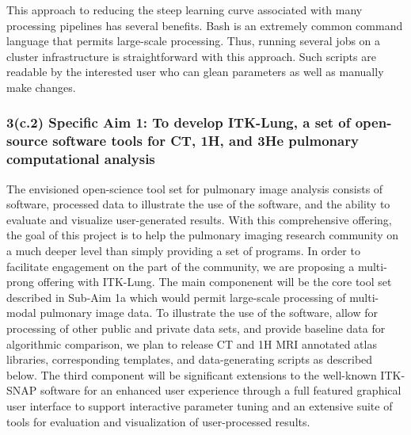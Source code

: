 \documentclass[11pt,]{article}
\newenvironment{Shaded}{\begin{snugshade}}{\end{snugshade}}
\newcommand{\KeywordTok}[1]{\textcolor[rgb]{0.13,0.29,0.53}{\textbf{{#1}}}}
\newcommand{\CommentTok}[1]{\textcolor[rgb]{0.56,0.35,0.01}{\textit{{#1}}}}
\newcommand{\NormalTok}[1]{{#1}}
\begin{document}
\begin{Shaded}
\end{Shaded}

This approach to reducing the steep learning curve associated with many
processing pipelines has several benefits. Bash is an extremely common
command language that permits large-scale processing. Thus, running
several jobs on a cluster infrastructure is straightforward with this
approach. Such scripts are readable by the interested user who can glean
parameters as well as manually make changes.

\subsubsection{3(c.2) \textbf{Specific Aim 1:} To develop ITK-Lung, a
set of open-source software tools for CT, 1H, and 3He pulmonary
computational
analysis}\label{c.2-specific-aim-1-to-develop-itk-lung-a-set-of-open-source-software-tools-for-ct-1h-and-3he-pulmonary-computational-analysis}

The envisioned open-science tool set for pulmonary image analysis
consists of software, processed data to illustrate the use of the
software, and the ability to evaluate and visualize user-generated
results. With this comprehensive offering, the goal of this project is
to help the pulmonary imaging research community on a much deeper level
than simply providing a set of programs. In order to facilitate
engagement on the part of the community, we are proposing a multi-prong
offering with ITK-Lung. The main componenent will be the core tool set
described in Sub-Aim 1a which would permit large-scale processing of
multi-modal pulmonary image data. To illustrate the use of the software,
allow for processing of other public and private data sets, and provide
baseline data for algorithmic comparison, we plan to release CT and 1H
MRI annotated atlas libraries, corresponding templates, and
data-generating scripts as described below. The third component will be
significant extensions to the well-known ITK-SNAP software for an
enhanced user experience through a full featured graphical user
interface to support interactive parameter tuning and an extensive suite
of tools for evaluation and visualization of user-processed results.
\end{document}
